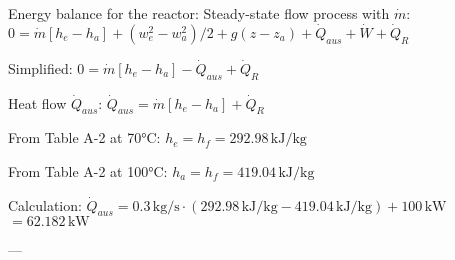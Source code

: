 Energy balance for the reactor: Steady-state flow process with \( \dot{m} \):  
\( 0 = \dot{m} [h_e - h_a] + (w_e^2 - w_a^2) / 2 + g(z - z_a) + \dot{Q}_{aus} + \dot{W} + \dot{Q}_R \)  

Simplified:  
\( 0 = \dot{m} [h_e - h_a] - \dot{Q}_{aus} + \dot{Q}_R \)  

Heat flow \( \dot{Q}_{aus} \):  
\( \dot{Q}_{aus} = \dot{m} [h_e - h_a] + \dot{Q}_R \)  

From Table A-2 at 70°C:  
\( h_e = h_f = 292.98 \, \text{kJ/kg} \)  

From Table A-2 at 100°C:  
\( h_a = h_f = 419.04 \, \text{kJ/kg} \)  

Calculation:  
\( \dot{Q}_{aus} = 0.3 \, \text{kg/s} \cdot (292.98 \, \text{kJ/kg} - 419.04 \, \text{kJ/kg}) + 100 \, \text{kW} \)  
\( = 62.182 \, \text{kW} \)  

---